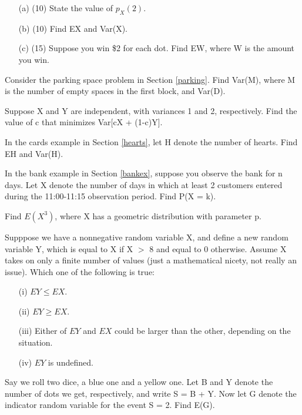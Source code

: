 \begin{itemize}

   \item [(a)] (10) State the value of $p_X(2)$.

   \item [(b)] (10) Find EX and Var(X).

   \item [(c)] (15) Suppose you win \$2 for each dot.  Find EW,
   where W is the amount you win.

\end{itemize}

\oneproblem
Consider the parking space problem in Section \ref{parking}.  Find
Var(M), where M is the number of empty spaces in the first block, and
Var(D).

\oneproblem
Suppose X and Y are independent, with variances 1 and 2,
respectively.  Find the value of c that minimizes Var[cX + (1-c)Y].

\oneproblem
In the cards example in Section \ref{hearts}, let H denote the number of
hearts. Find EH and Var(H).

\oneproblem
In the bank example in Section \ref{bankex}, suppose you observe the
bank for n days. Let X denote the number of days in which at least 2 
customers entered during the 11:00-11:15 observation period. Find P(X = k).

\oneproblem
Find $E(X^3)$, where X has a geometric distribution with parameter p.

\oneproblem
Supppose we have a nonnegative random variable X, and define a new
random variable Y, which is equal to X if X $>$ 8 and equal to 0
otherwise.  Assume X takes on only a finite number of values (just a
mathematical nicety, not really an issue).  Which one of the following
is true:

\begin{itemize}

\item [(i)] $EY \leq EX$.

\item [(ii)] $EY \geq EX$.

\item [(iii)] Either of $EY$ and $EX$ could be larger than the other,
depending on the situation.

\item [(iv)] $EY$ is undefined.

\end{itemize}

\oneproblem
Say we roll two dice, a blue one and a yellow one.  Let B
and Y denote the number of dots we get, respectively, and write S = B +
Y.  Now let G denote the indicator random variable for the event S = 2.  
Find E(G).

